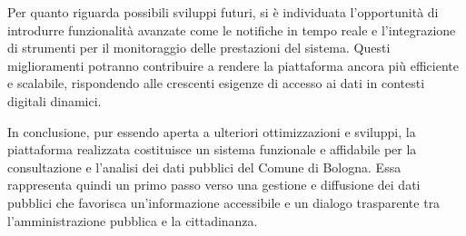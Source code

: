 Per quanto riguarda possibili sviluppi futuri, si è individuata l’opportunità di introdurre funzionalità avanzate come le notifiche in tempo reale e l'integrazione di strumenti per il monitoraggio delle prestazioni del sistema. Questi miglioramenti potranno contribuire a rendere la piattaforma ancora più efficiente e scalabile, rispondendo alle crescenti esigenze di accesso ai dati in contesti digitali dinamici.

In conclusione, pur essendo aperta a ulteriori ottimizzazioni e sviluppi, la piattaforma realizzata costituisce un sistema funzionale e affidabile per la consultazione e l'analisi dei dati pubblici del Comune di Bologna. Essa rappresenta quindi un primo passo verso una gestione e diffusione dei dati pubblici che favorisca un'informazione accessibile e un dialogo trasparente tra l'amministrazione pubblica e la cittadinanza.

